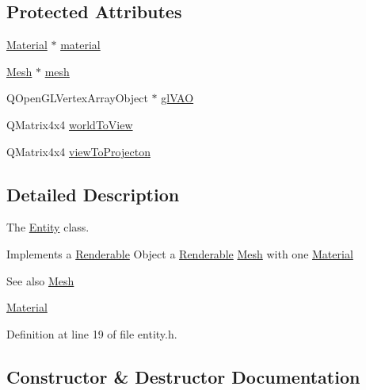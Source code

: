 \subsection*{Protected Attributes}
\begin{DoxyCompactItemize}
\item 
\hyperlink{class_material}{Material} $\ast$ \hyperlink{class_entity_adbbe41659ac87bbed15c53e6101292e8}{material}
\item 
\hyperlink{class_mesh}{Mesh} $\ast$ \hyperlink{class_entity_ab346a9ce19733368f64f9109fb290ff1}{mesh}
\item 
Q\+Open\+G\+L\+Vertex\+Array\+Object $\ast$ \hyperlink{class_entity_aaddc09c82caf2a17d745af5283771eac}{gl\+V\+A\+O}
\item 
Q\+Matrix4x4 \hyperlink{class_entity_ad9ec1327cacd74787dd951ff4389ca15}{world\+To\+View}
\item 
Q\+Matrix4x4 \hyperlink{class_entity_adddbfb9b19b765cb9674ad95fe9f22ce}{view\+To\+Projecton}
\end{DoxyCompactItemize}


\subsection{Detailed Description}
The \hyperlink{class_entity}{Entity} class. 

Implements a \hyperlink{class_renderable}{Renderable} Object a \hyperlink{class_renderable}{Renderable} \hyperlink{class_mesh}{Mesh} with one \hyperlink{class_material}{Material}

\begin{DoxySeeAlso}{See also}
\hyperlink{class_mesh}{Mesh} 

\hyperlink{class_material}{Material} 
\end{DoxySeeAlso}


Definition at line 19 of file entity.\+h.



\subsection{Constructor \& Destructor Documentation}
\hypertarget{class_entity_acf4f8570960b2173a894a99ec9967215}{}
